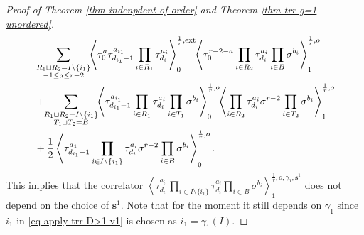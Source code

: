 \documentclass[11pt]{amsart}
\theoremstyle{definition}
\theoremstyle{remark}
\newcommand{\consta}{{\frac{1}{2}}}
\newcommand{\<}{\left<}
\renewcommand{\>}{\right>}
\numberwithin{equation}{section}
\begin{document}
\begin{proof}[Proof of Theorem \ref{thm indenpdent of order} and Theorem \ref{thm trr g=1 unordered}]
    \begin{equation}\label{eq apply trr D>1 v1}
        \begin{split}
    &\sum_{\substack{R_1 \sqcup R_2 = I\setminus\{i_1\}\\ -1\le a \le r-2}}\hspace{-0.1cm}\left\langle \tau_0^{a}\tau_{d_{i_1}-1}^{a_{i_1}}\prod_{i \in R_1}\tau_{d_i}^{a_i}\right\rangle^{\frac{1}{r},\text{ext}}_0
    \hspace{-0.1cm}\left\langle \tau_0^{r-2-a}\prod_{i\in R_2}\tau^{a_i}_{d_i}\prod_{i\in B}\sigma^{b_i}\right\rangle^{\frac{1}{r},o}_1\\
    &+\hspace{-0.1cm}\sum_{\substack{R_1 \sqcup R_2 =  I\setminus\{i_1\} \\ T_1 \sqcup T_2 =  B}} \hspace{-0.1cm} \left\langle \tau^{a_{i_1}}_{d_{i_1}-1}\prod_{i \in R_1} \tau^{a_i}_{d_i}\prod_{i\in T_1}\sigma^{b_i}\right\rangle^{\frac{1}{r},o}_0 \hspace{-0.1cm}\left\langle \prod_{i \in R_2} \tau^{a_i}_{d_i} \sigma^{r-2}\prod_{i\in T_2}\sigma^{b_i}\right\rangle^{\frac{1}{r}, o}_1\\
    &+\consta\left\langle \tau_{d_{i_1}-1}^{a_1}\prod_{i\in I\setminus\{i_1\}}\tau^{a_i}_{d_i}\sigma^{r-2}\prod_{i\in B}\sigma^{b_i}\right\rangle^{\frac{1}{r},o}_0.
    \end{split}
    \end{equation} 
    This implies that the correlator 
    $\left\langle \tau_{d_{i_1}}^{a_{i_1}}\prod_{i\in I\setminus \{i_1\}}\tau^{a_i}_{d_i}\prod_{i\in B}\sigma^{b_i}\right\rangle^{\frac{1}{r},o,\gamma_1,\bm{s}^1}_1$ does not depend on the choice of $\bm{s}^1$. Note that for the moment it still depends on $\gamma_1$ since $i_1$ in \eqref{eq apply trr D>1 v1} is chosen as $i_1=\gamma_1(I)$.


\end{proof}
\end{document}
